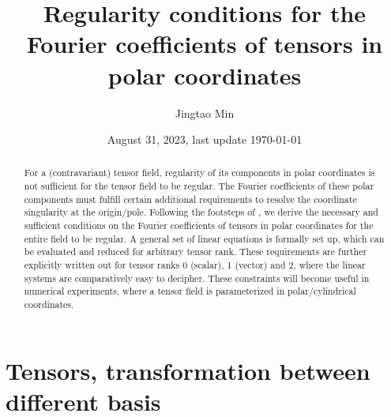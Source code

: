 \documentclass[a4paper, 11pt]{article}
\title{Regularity conditions for the Fourier coefficients of tensors in polar coordinates}
\author{Jingtao Min}
\date{August 31, 2023, last update \today}
\begin{document}
\maketitle

\begin{abstract}
    For a (contravariant) tensor field, regularity of its components in polar coordinates is not sufficient for the tensor field to be regular. The Fourier coefficients of these polar components must fulfill certain additional requirements to resolve the coordinate singularity at the origin/pole. Following the footsteps of \textcite{lewis_physical_1990}, we derive the necessary and sufficient conditions on the Fourier coefficients of tensors in polar coordinates for the entire field to be regular. A general set of linear equations is formally set up, which can be evaluated and reduced for arbitrary tensor rank. These requirements are further explicitly written out for tensor ranks 0 (scalar), 1 (vector) and 2, where the linear systems are comparatively easy to decipher. These constraints will become useful in numerical experiments, where a tensor field is parameterized in polar/cylindrical coordinates.
\end{abstract}

\section{Tensors, transformation between different basis}
\end{document}
